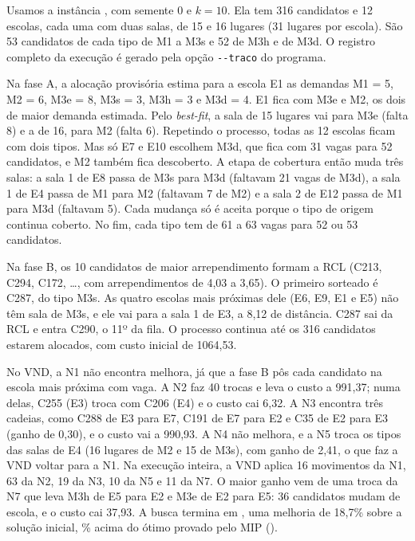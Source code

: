 \documentclass[12pt]{article}
\begin{document}
Usamos a instância \idExemplo{}, com semente 0 e $k = 10$. Ela tem 316 candidatos e 12 escolas,
cada uma com duas salas, de 15 e 16 lugares (31 lugares por escola). São 53 candidatos de cada
tipo de M1 a M3s e 52 de M3h e de M3d. O registro completo da execução é gerado pela opção
\texttt{-{}-traco} do programa.

Na fase A, a alocação provisória estima para a escola E1 as demandas M1 = 5, M2 = 6, M3e = 8,
M3s = 3, M3h = 3 e M3d = 4. E1 fica com M3e e M2, os dois de maior demanda estimada. Pelo
\emph{best-fit}, a sala de 15 lugares vai para M3e (falta 8) e a de 16, para M2 (falta 6).
Repetindo o processo, todas as 12 escolas ficam com dois tipos. Mas só E7 e E10 escolhem M3d, que
fica com 31 vagas para 52 candidatos, e M2 também fica descoberto. A etapa de cobertura então muda
três salas: a sala 1 de E8 passa de M3s para M3d (faltavam 21 vagas de M3d), a sala 1 de E4 passa
de M1 para M2 (faltavam 7 de M2) e a sala 2 de E12 passa de M1 para M3d (faltavam 5). Cada mudança
só é aceita porque o tipo de origem continua coberto. No fim, cada tipo tem de 61 a 63 vagas para
52 ou 53 candidatos.

Na fase B, os 10 candidatos de maior arrependimento formam a RCL (C213, C294, C172, \ldots, com
arrependimentos de 4,03 a 3,65). O primeiro sorteado é C287, do tipo M3s. As quatro escolas mais
próximas dele (E6, E9, E1 e E5) não têm sala de M3s, e ele vai para a sala 1 de E3, a 8,12 de
distância. C287 sai da RCL e entra C290, o 11º da fila. O processo continua até os 316 candidatos
estarem alocados, com custo inicial de 1064,53.

No VND, a N1 não encontra melhora, já que a fase B pôs cada candidato na escola mais próxima com
vaga. A N2 faz 40 trocas e leva o custo a 991,37; numa delas, C255 (E3) troca com C206 (E4) e o
custo cai 6,32. A N3 encontra três cadeias, como C288 de E3 para E7, C191 de E7 para E2 e C35 de E2
para E3 (ganho de 0,30), e o custo vai a 990,93. A N4 não melhora, e a N5 troca os tipos das salas
de E4 (16 lugares de M2 e 15 de M3s), com ganho de 2,41, o que faz a VND voltar para a N1. Na
execução inteira, a VND aplica 16 movimentos da N1, 63 da N2, 19 da N3, 10 da N5 e 11 da N7. O
maior ganho vem de uma troca da N7 que leva M3h de E5 para E2 e M3e de E2 para E5: 36 candidatos
mudam de escola, e o custo cai 37,93. A busca termina em \finalExemplo, uma melhoria de 18,7\%
sobre a solução inicial, \gapExemplo\% acima do ótimo provado pelo MIP ().

\end{document}
